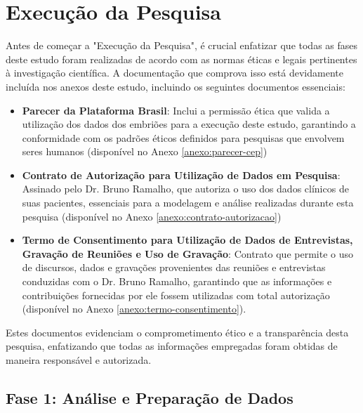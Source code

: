 
\chapter[Execução da Pesquisa]{Execução da Pesquisa}

Antes de começar a "Execução da Pesquisa", é crucial enfatizar que todas as fases deste estudo foram realizadas de acordo com as normas éticas e legais pertinentes à investigação científica. A documentação que comprova isso está devidamente incluída nos anexos deste estudo, incluindo os seguintes documentos essenciais:
\begin{itemize}
  \item \textbf{Parecer da Plataforma Brasil}: Inclui a permissão ética que valida a utilização dos dados dos embriões para a execução deste estudo, garantindo a conformidade com os padrões éticos definidos para pesquisas que envolvem seres humanos (disponível no Anexo \ref{anexo:parecer-cep}) 
  \item \textbf{Contrato de Autorização para Utilização de Dados em Pesquisa}: Assinado pelo Dr. Bruno Ramalho, que autoriza o uso dos dados clínicos de suas pacientes, essenciais para a modelagem e análise realizadas durante esta pesquisa (disponível no Anexo \ref{anexo:contrato-autorizacao})
  \item \textbf{Termo de Consentimento para Utilização de Dados de Entrevistas, Gravação de Reuniões e Uso de Gravação}: Contrato que permite o uso de discursos, dados e gravações provenientes das reuniões e entrevistas conduzidas com o Dr. Bruno Ramalho, garantindo que as informações e contribuições fornecidas por ele fossem utilizadas com total autorização (disponível no Anexo \ref{anexo:termo-consentimento}). 
\end{itemize}
Estes documentos evidenciam o comprometimento ético e a transparência desta pesquisa, enfatizando que todas as informações empregadas foram obtidas de maneira responsável e autorizada. 

\section{Fase 1: Análise e Preparação de Dados}
